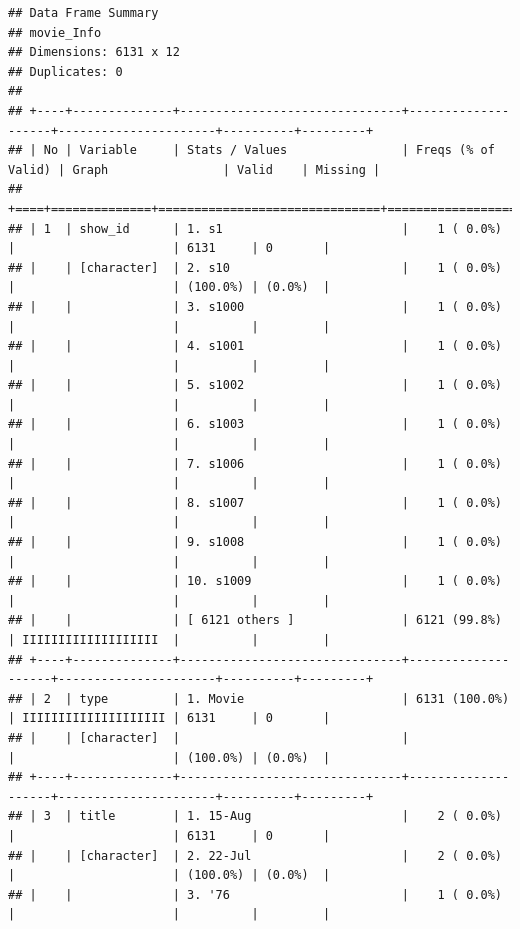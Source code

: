 \documentclass[11pt,preprint]{elsarticle}
\numberwithin{equation}{section}
\numberwithin{figure}{section}
\numberwithin{table}{section}
\begin{document}
\begin{verbatim}
## Data Frame Summary  
## movie_Info  
## Dimensions: 6131 x 12  
## Duplicates: 0  
## 
## +----+--------------+-------------------------------+--------------------+----------------------+----------+---------+
## | No | Variable     | Stats / Values                | Freqs (% of Valid) | Graph                | Valid    | Missing |
## +====+==============+===============================+====================+======================+==========+=========+
## | 1  | show_id      | 1. s1                         |    1 ( 0.0%)       |                      | 6131     | 0       |
## |    | [character]  | 2. s10                        |    1 ( 0.0%)       |                      | (100.0%) | (0.0%)  |
## |    |              | 3. s1000                      |    1 ( 0.0%)       |                      |          |         |
## |    |              | 4. s1001                      |    1 ( 0.0%)       |                      |          |         |
## |    |              | 5. s1002                      |    1 ( 0.0%)       |                      |          |         |
## |    |              | 6. s1003                      |    1 ( 0.0%)       |                      |          |         |
## |    |              | 7. s1006                      |    1 ( 0.0%)       |                      |          |         |
## |    |              | 8. s1007                      |    1 ( 0.0%)       |                      |          |         |
## |    |              | 9. s1008                      |    1 ( 0.0%)       |                      |          |         |
## |    |              | 10. s1009                     |    1 ( 0.0%)       |                      |          |         |
## |    |              | [ 6121 others ]               | 6121 (99.8%)       | IIIIIIIIIIIIIIIIIII  |          |         |
## +----+--------------+-------------------------------+--------------------+----------------------+----------+---------+
## | 2  | type         | 1. Movie                      | 6131 (100.0%)      | IIIIIIIIIIIIIIIIIIII | 6131     | 0       |
## |    | [character]  |                               |                    |                      | (100.0%) | (0.0%)  |
## +----+--------------+-------------------------------+--------------------+----------------------+----------+---------+
## | 3  | title        | 1. 15-Aug                     |    2 ( 0.0%)       |                      | 6131     | 0       |
## |    | [character]  | 2. 22-Jul                     |    2 ( 0.0%)       |                      | (100.0%) | (0.0%)  |
## |    |              | 3. '76                        |    1 ( 0.0%)       |                      |          |         |

\end{verbatim}
\end{document}
